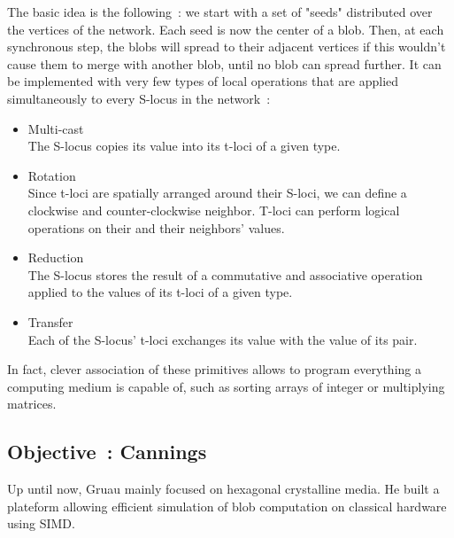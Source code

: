 \documentclass{article}
\begin{document}
The basic idea is the following~: we start with a set of "seeds" distributed over the vertices of the network. Each seed is now the center of a blob. Then, at each synchronous step, the blobs will spread to their adjacent vertices if this wouldn't cause them to merge with another blob, until no blob can spread further. It can be implemented with very few types of local operations that are applied simultaneously to every S-locus in the network~:
\begin{itemize}
	\item Multi-cast\\
	The S-locus copies its value into its t-loci of a given type.
	\item Rotation\\
	Since t-loci are spatially arranged around their S-loci, we can define a clockwise and counter-clockwise neighbor. T-loci can perform logical operations on their and their neighbors' values.
	\item Reduction\\
	The S-locus stores the result of a commutative and associative operation applied to the values of its t-loci of a given type.
	\item Transfer\\
	Each of the S-locus' t-loci exchanges its value with the value of its pair. 
\end{itemize}
In fact, clever association of these primitives allows to program everything a computing medium is capable of, such as sorting arrays of integer or multiplying matrices\supercite{blob_computing2}.

\subsection{Objective~: Cannings}

Up until now, Gruau mainly focused on hexagonal crystalline media. He built a plateform allowing efficient simulation of blob computation on classical hardware using SIMD\supercite{Voronoi, platform_CA2}. 
\end{document}
